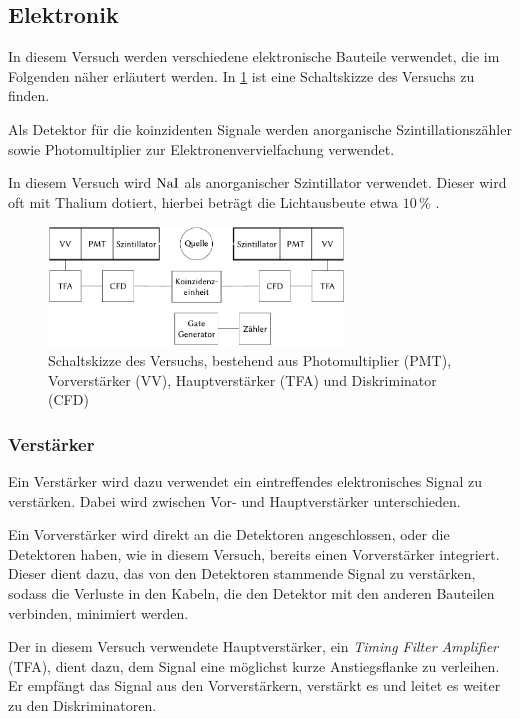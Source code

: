 \documentclass[12pt,a4paper]{scrartcl}
\numberwithin{equation}{section} %
\begin{document}
\hypertarget{elektronik}{%
\subsection{Elektronik}\label{elektronik}}

In diesem Versuch werden verschiedene elektronische Bauteile verwendet, die im Folgenden näher erläutert werden. In \ref{abb:Schaltplan} ist eine Schaltskizze des Versuchs zu finden.

Als Detektor für die koinzidenten Signale werden anorganische Szintillationszähler sowie Photomultiplier zur Elektronenvervielfachung verwendet.

In diesem Versuch wird $\ce{NaI}$ als anorganischer Szintillator verwendet. Dieser wird oft mit Thalium dotiert, hierbei beträgt die Lichtausbeute etwa $10\,\%$ \cite{EigenschaftenSzintillatoren}.

\begin{figure}[h]
	\centering
	\includegraphics[width=0.7\textwidth]{../media/B3.4/Schaltplan.pdf}
	\caption{Schaltskizze des Versuchs, bestehend aus
		Photomultiplier (PMT), Vorverstärker (VV),
		Hauptverstärker (TFA) und Diskriminator (CFD) \cite{UzK}}
	\label{abb:Schaltplan}
\end{figure}


\hypertarget{verstuxe4rker}{%
\subsubsection{Verstärker}\label{verstuxe4rker}}

Ein Verstärker wird dazu verwendet ein eintreffendes elektronisches Signal zu verstärken. Dabei wird zwischen Vor- und Hauptverstärker unterschieden.

Ein Vorverstärker wird direkt an die Detektoren angeschlossen, oder die Detektoren haben, wie in diesem Versuch, bereits einen Vorverstärker integriert. Dieser dient dazu, das von den Detektoren stammende Signal
zu verstärken, sodass die Verluste in den Kabeln, die den Detektor mit den anderen Bauteilen verbinden, minimiert werden.

Der in diesem Versuch verwendete Hauptverstärker, ein \emph{Timing Filter Amplifier} (TFA), dient dazu, dem Signal eine möglichst kurze Anstiegsflanke zu verleihen. Er empfängt das Signal aus den Vorverstärkern, verstärkt es und leitet es weiter zu den Diskriminatoren.
\end{document}

